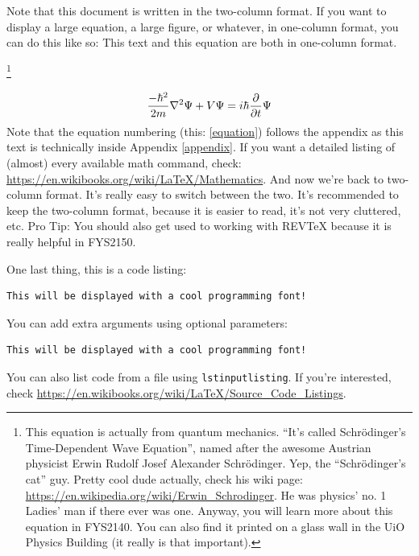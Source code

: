 \documentclass[reprint,english,notitlepage]{revtex4-1}  %
\begin{document}

\clearpage
Note that this document is written in the two-column format. If you want to display a large equation, a large figure, or whatever, in one-column format, you can do this like so:
\onecolumngrid
\vspace{1cm} %
This text and this equation are both in one-column format.

\footnote{This equation is actually from quantum mechanics. ``It's called Schrödinger's Time-Dependent Wave Equation'', named after the awesome Austrian physicist Erwin Rudolf Josef Alexander Schrödinger. Yep, the ``Schrödinger's cat'' guy. Pretty cool dude actually, check his wiki page: \url{https://en.wikipedia.org/wiki/Erwin_Schrodinger}. He was physics' no. 1 Ladies' man if there ever was one. Anyway, you will learn more about this equation in FYS2140. You can also find it printed on a glass wall in the UiO Physics Building (it really is that important).}

\begin{equation}\label{equation}
\frac{-\hbar^2}{2m}\laplacian{\Psi}+V\Psi=i\hbar\pdv{t}\Psi
\end{equation}
Note that the equation numbering (this: \ref{equation}) follows the appendix as this text is technically inside Appendix \ref{appendix}. If you want a detailed listing of (almost) every available math command, check: \url{https://en.wikibooks.org/wiki/LaTeX/Mathematics}.
\vspace{1cm} %
\twocolumngrid
And now we're back to two-column format. It's really easy to switch between the two. It's recommended to keep the two-column format, because it is easier to read, it's not very cluttered, etc. Pro Tip: You should also get used to working with REVTeX because it is really helpful in FYS2150.

One last thing, this is a code listing:
\begin{lstlisting}
This will be displayed with a cool programming font!
\end{lstlisting}
You can add extra arguments using optional parameters:
\begin{lstlisting}[morekeywords={cool}]
This will be displayed with a cool programming font!
\end{lstlisting}
You can also list code from a file using \texttt{lstinputlisting}. If you're interested, check \url{https://en.wikibooks.org/wiki/LaTeX/Source_Code_Listings}.
\end{document}

